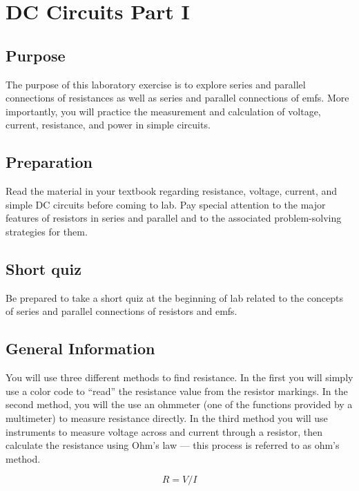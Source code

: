 \chapter {DC Circuits Part I}

\section{Purpose}  
The purpose of this laboratory exercise is to explore series and parallel connections of resistances as well as series and parallel connections of emfs.  More importantly, you will practice the measurement and calculation of voltage, current, resistance, and power in simple circuits.

\section{Preparation}  
Read the material in your textbook regarding resistance, voltage, current, and simple DC circuits before coming to lab. Pay special attention to the major features of resistors in series and parallel and to the associated problem-solving strategies for them.

\section {Short quiz}  Be prepared to take a short quiz at the beginning of lab related to the concepts of series and parallel connections of resistors and emfs.

\section{General Information}
You will use three different methods to find resistance.  In the first you will simply use a color code to ``read'' the resistance value from the resistor markings. In the second method, you will the use an ohmmeter (one of the functions provided by a multimeter) to measure resistance directly.  In the third method you will use instruments to measure voltage across and current through a resistor, then calculate the resistance using Ohm's law --- this process is  referred to as ohm's method.

\begin{equation} R = V/I \label{e:ohm} \end{equation}

